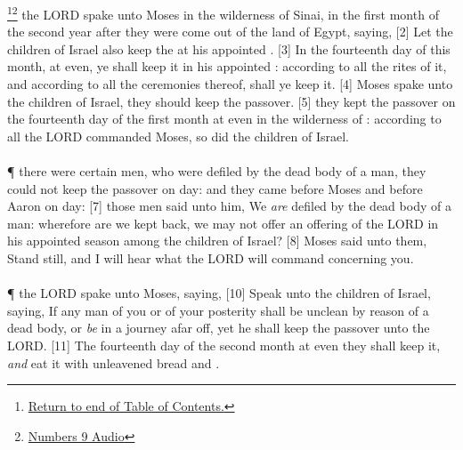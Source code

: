 \footnote{\textcolor[cmyk]{0.99998,1,0,0}{\hyperlink{TOC}{Return to end of Table of Contents.}}}\footnote{\href{https://audiobible.com/bible/numbers_9.html}{\textcolor[cmyk]{0.99998,1,0,0}{Numbers 9 Audio}}}\textcolor[cmyk]{0.99998,1,0,0}{ the LORD spake unto Moses in the wilderness of Sinai, in the first month of the second year after they were come out of the land of Egypt, saying,}
[2] \textcolor[cmyk]{0.99998,1,0,0}{Let the children of Israel also keep the  at his appointed .}
[3] \textcolor[cmyk]{0.99998,1,0,0}{In the fourteenth day of this month, at even, ye shall keep it in his appointed : according to all the rites of it, and according to all the ceremonies thereof, shall ye keep it.}
[4] \textcolor[cmyk]{0.99998,1,0,0}{ Moses spake unto the children of Israel,  they should keep the passover.}
[5] \textcolor[cmyk]{0.99998,1,0,0}{ they kept the passover on the fourteenth day of the first month at even in the wilderness of : according to all  the LORD commanded Moses, so did the children of Israel.}\\
\\
\P \textcolor[cmyk]{0.99998,1,0,0}{ there were certain men, who were defiled by the dead body of a man,  they could not keep the passover on  day: and they came before Moses and before Aaron on  day:}
[7] \textcolor[cmyk]{0.99998,1,0,0}{ those men said unto him, We \emph{are} defiled by the dead body of a man: wherefore are we kept back,  we may not offer an offering of the LORD in his appointed season among the children of Israel?}
[8] \textcolor[cmyk]{0.99998,1,0,0}{ Moses said unto them, Stand still, and I will hear what the LORD will command concerning you.}\\
\\
\P \textcolor[cmyk]{0.99998,1,0,0}{ the LORD spake unto Moses, saying,}
[10] \textcolor[cmyk]{0.99998,1,0,0}{Speak unto the children of Israel, saying, If any man of you or of your posterity shall be unclean by reason of a dead body, or \emph{be} in a journey afar off, yet he shall keep the passover unto the LORD.}
[11] \textcolor[cmyk]{0.99998,1,0,0}{The fourteenth day of the second month at even they shall keep it, \emph{and} eat it with unleavened bread and .}
